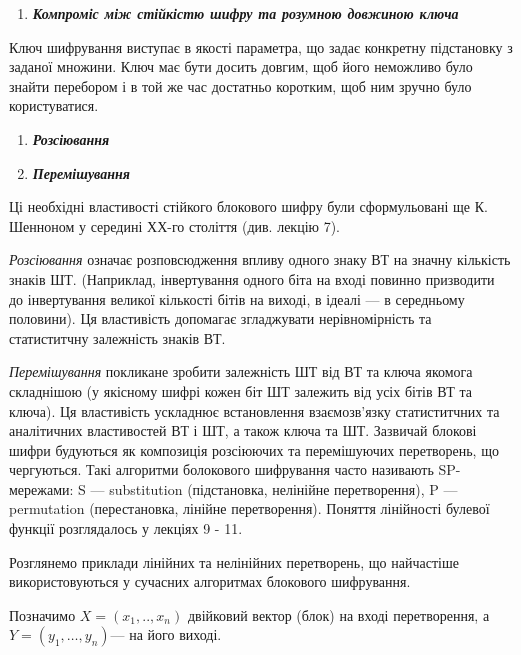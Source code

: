 \bigskip

\liststyleWWviiiNumix
\setcounter{saveenum}{\value{enumi}}
\begin{enumerate}
\setcounter{enumi}{\value{saveenum}}
\item {\bfseries\itshape
Компроміс між стійкістю шифру та розумною довжиною  ключа}
\end{enumerate}
 Ключ шифрування виступає в якості параметра, що задає конкретну підстановку з
заданої множини. Ключ має бути досить довгим, щоб його неможливо було знайти
перебором і в той же час достатньо коротким, щоб ним зручно було користуватися.

\liststyleWWviiiNumlv
\begin{enumerate}
\item {\bfseries\itshape
Розсіювання}
\item {\bfseries\itshape
Перемішування}
\end{enumerate}
Ці необхідні властивості стійкого блокового шифру були сформульовані ще К.
Шенноном  у середині ХХ-го століття (див. лекцію 7). 

\textit{Розсіювання} означає розповсюдження впливу одного знаку ВТ на значну
кількість знаків ШТ. (Наприклад, інвертування одного біта на вході повинно
призводити до інвертування великої кількості бітів на виході, в ідеалі --- в
середньому половини). Ця властивість допомагає згладжувати нерівномірність та
статиститчну залежність знаків ВТ.\textit{ }

\textit{Перемішування} покликане зробити залежність ШТ від ВТ та ключа якомога
складнішою (у якісному шифрі кожен біт ШТ залежить від усіх бітів ВТ та ключа).
Ця властивість ускладнює встановлення взаємозв’язку статиститчних та
аналітичних властивостей ВТ і ШТ, а також ключа та ШТ. Зазвичай блокові шифри
будуються як\textbf{ }композиція  розсіюючих та\textbf{ }перемішуючих
перетворень, що чергуються. Такі алгоритми болокового шифрування часто
називають SP{}-мережами: S --- substitution (підстановка, нелінійне
перетворення), P --- permutation (перестановка, лінійне перетворення). Поняття
лінійності булевої функції розглядалось у лекціях 9 - 11.

Розглянемо приклади лінійних та нелінійних перетворень, що найчастіше
використовуються у сучасних алгоритмах блокового шифрування.

Позначимо  $X=(x_{1},\text{.}\text{.},x_n)$ двійковий вектор (блок) на
вході перетворення, а   $Y=(y_{1},\dots,y_n)$--- на
його виході.


\bigskip

